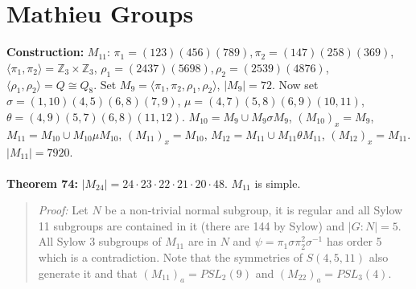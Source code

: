 \section{Mathieu Groups}
{\bf Construction:}
$M_{11}$: $\pi_1= (123)(456)(789), \pi_2= (147)(258)(369)$,
$ \langle \pi_1, \pi_2 \rangle = {\mathbb Z}_3 \times {\mathbb Z}_3$, 
$\rho_1= (2437)(5698), \rho_2= (2539)(4876)$, $ \langle \rho_1 , \rho_2 \rangle = Q \cong Q_8$.  Set
$M_9= \langle \pi_1 , \pi_2 , \rho_1 , \rho_2 \rangle $, $|M_9|=72$.  
Now set $\sigma= (1, 10)(4,5)(6,8)(7,9)$, $\mu= (4,7)(5,8) (6,9) (10,11)$,
$\theta= (4,9) (5,7) (6,8)(11,12)$.  
$M_{10}= M_9 \cup M_9 \sigma M_9$,  $(M_{10})_x= M_{9}$,
$M_{11}= M_{10} \cup M_{10} \mu M_{10}$,  $(M_{11})_x= M_{10}$,
$M_{12}= M_{11} \cup M_{11} \theta M_{11}$,  $(M_{12})_x= M_{11}$.  $|M_{11}|=7920$.
\\
\\
{\bf Theorem 74:}
$|M_{24}|= 24 \cdot 23 \cdot 22 \cdot 21 \cdot 20 \cdot 48 $.  $M_{11}$ is simple.
\begin{quote}
\emph{Proof:}
Let $N$ be a non-trivial normal subgroup, it is regular and all Sylow 11 subgroups
are contained in it (there are 144 by Sylow) and $|G:N|= 5$.  All Sylow 3 subgroups
of $M_{11}$ are in $N$ and $\psi= \pi_1 \sigma \pi_2^2 \sigma^{-1}$ has order 5 which is a
contradiction.  Note that the symmetries of $S(4,5,11)$ also generate it and
that $(M_{11})_a= PSL_2(9)$ and $(M_{22})_a = PSL_3(4)$.
\end{quote}
